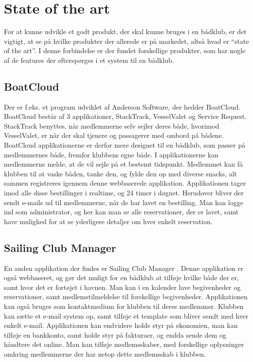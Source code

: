 \section{State of the art}

For at kunne udvikle et godt produkt, der skal kunne bruges i en bådklub, er det vigtigt, at se på hvilke
produkter der allerede er på markedet, altså hvad er ``state of the art''. I denne forbindelse er der fundet
forskellige produkter, som har nogle af de features der efterspørges i et system til en bådklub.


\subsection*{BoatCloud}

Der er f.eks. et program udviklet af Anderson Software, der hedder BoatCloud.\citep{BoatCloud} BoatCloud
består af 3 applikationer, StackTrack, VesselValet og Service Request. StackTrack benyttes, når medlemmerne selv sejler
deres både, hvorimod VesselValet, er
når der skal tjenere og passagerer med ombord på bådene. BoatCloud applikationerne er derfor mere designet til
en bådklub, som passer på medlemmernes både, fremfor klubbens egne både. I applikationerne kan medlemmerne
melde, at de vil sejle på et bestemt tidspunkt. Medlemmet kan få klubben til at vaske båden, tanke den, og
fylde den op med diverse snacks, alt sammen registreres igennem denne webbaserede applikation. Applikationen
tager imod alle disse bestillinger i realtime, og 24 timer i døgnet. Herudover bliver der sendt e-mails ud til
medlemmerne, når de har lavet en bestilling. Man kan logge ind som administrator, og her kan man se alle
reservationer, der er lavet, samt have mulighed for at se yderligere detaljer om hver enkelt reservation.


\subsection*{Sailing Club Manager}

En anden applikation der findes er Sailing Club Manager \citep{SailClub}. Denne applikation er også
webbaseret, og gør det muligt for en bådklub at tilføje hvilke både der er, samt hvor det er fortøjet i
havnen. Man kan i en kalender lave begivenheder og reservationer, samt medlemstilmeldelse til forskellige
begivenheder. Applikationen kan også bruges som kontaktmedium for klubben til deres medlemmer. Klubben kan
sætte et e-mail system op, samt tilføje et template som bliver sendt med hver enkelt e-mail. Applikationen kan
endvidere holde styr på økonomien, man kan tilføje en bankkonto, samt  holde styr på fakturaer, og endda sende
dem og håndtere det online. Man kan tilføje medlemsskaber, med forskellige oplysninger omkring medlemmerne der
har netop dette medlemsskab i klubben.



